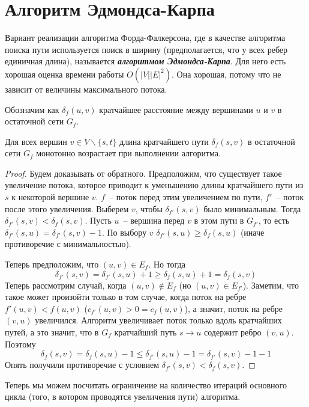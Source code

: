 \let\bf\bfseries
\let\it\itshape
\section{Алгоритм Эдмондса-Карпа}\label{edmonds_karp}

\secauthor{\egor}
Вариант реализации алгоритма Форда-Фалкерсона, где в качестве алгоритма поиска пути используется поиск в ширину (предполагается, что у всех ребер единичная длина), называется {\bf\it алгоритмом Эдмондса-Карпа}. Для него есть хорошая оценка времени работы $O(|V||E|^2)$. Она хорошая, потому что не зависит от величины максимального потока.

Обозначим как $\delta_f(u,v)$ кратчайшее расстояние между вершинами $u$ и $v$ в остаточной сети $G_f$.
\begin{lemma}\label{someshit5}
	Для всех вершин $v\in V\smallsetminus\{s,t\}$ длина кратчайшего пути $\delta_f(s,v)$ в остаточной сети $G_f$ монотонно возрастает при выполнении алгоритма.
\end{lemma}
\begin{proof}
	Будем доказывать от обратного. Предположим, что существует такое увеличение потока, которое приводит к уменьшению длины кратчайшего пути из $s$ к некоторой вершине $v$. $f$~-- поток перед этим увеличением по пути, $f'$~-- поток после этого увеличения. Выберем $v$, чтобы $\delta_{f'}(s,v)$ было минимальным. Тогда $\delta_{f'}(s,v)<\delta_f(s,v)$. Пусть $u$~-- вершина перед $v$ в этом пути в $G_{f'}$, то есть $\delta_{f'}(s,u)=\delta_{f'}(s,v)-1$. По выбору $v$ $\delta_{f'}(s,u)\ge\delta_f(s,u)$ (иначе противоречие с минимальностью).

	Теперь предположим, что $(u,v)\in E_f$. Но тогда $$\delta_{f'}(s,v)=\delta_{f'}(s,u)+1\ge\delta_f(s,u)+1=\delta_f(s,v)$$
	Теперь рассмотрим случай, когда $(u,v)\not\in E_f$ (но $(u,v)\in E_{f'}$). Заметим, что такое может произойти только в том случае, когда поток на ребре $f'(u,v)<f(u,v)$ ($c_{f'}(u,v)>0=c_f(u,v)$), а значит, поток на ребре $(v,u)$ увеличился. Алгоритм увеличивает поток только вдоль кратчайших путей, а это значит, что в $G_f$ кратчайший путь $s\to u$ содержит ребро $(v,u)$. Поэтому $$\delta_f(s,v)=\delta_f(s,u)-1\le\delta_{f'}(s,u)-1=\delta_{f'}(s,v)-1-1$$
	Опять получили противоречие с условием $\delta_{f'}(s,v)<\delta_f(s,v)$.
\end{proof}

Теперь мы можем посчитать ограничение на количество итераций основного цикла (того, в котором проводятся увеличения пути) алгоритма.

